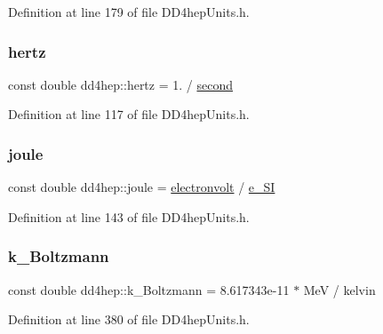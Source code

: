 Definition at line 179 of file D\+D4hep\+Units.\+h.

\hypertarget{namespacedd4hep_a5ada76b9ea37d13e1e346f2256017cff}{}\label{namespacedd4hep_a5ada76b9ea37d13e1e346f2256017cff} 
\subsubsection{\texorpdfstring{hertz}{hertz}}
{\footnotesize\ttfamily const double dd4hep\+::hertz = 1. / \hyperlink{namespacedd4hep_ac03364576705a245265d8ed6ea26b871}{second}\hspace{0.3cm}{\ttfamily [static]}}



Definition at line 117 of file D\+D4hep\+Units.\+h.

\hypertarget{namespacedd4hep_a8cdc11c61e5f953baede59569544a324}{}\label{namespacedd4hep_a8cdc11c61e5f953baede59569544a324} 
\subsubsection{\texorpdfstring{joule}{joule}}
{\footnotesize\ttfamily const double dd4hep\+::joule = \hyperlink{namespacedd4hep_a849fe8dd27af5a22a8d7891687a4d499}{electronvolt} / \hyperlink{namespacedd4hep_a18365e1a8b0f1730924219e336e11e9f}{e\+\_\+\+SI}\hspace{0.3cm}{\ttfamily [static]}}



Definition at line 143 of file D\+D4hep\+Units.\+h.

\hypertarget{namespacedd4hep_afc99056ae68c67788d6d7555a866e175}{}\label{namespacedd4hep_afc99056ae68c67788d6d7555a866e175} 
\subsubsection{\texorpdfstring{k\+\_\+\+Boltzmann}{k\_Boltzmann}}
{\footnotesize\ttfamily const double dd4hep\+::k\+\_\+\+Boltzmann = 8.\+617343e-\/11 $\ast$ Me\+V / kelvin\hspace{0.3cm}{\ttfamily [static]}}



Definition at line 380 of file D\+D4hep\+Units.\+h.

\hypertarget{namespacedd4hep_ae4984489719e11b38858934cc4c1e54e}{}\label{namespacedd4hep_ae4984489719e11b38858934cc4c1e54e} 

